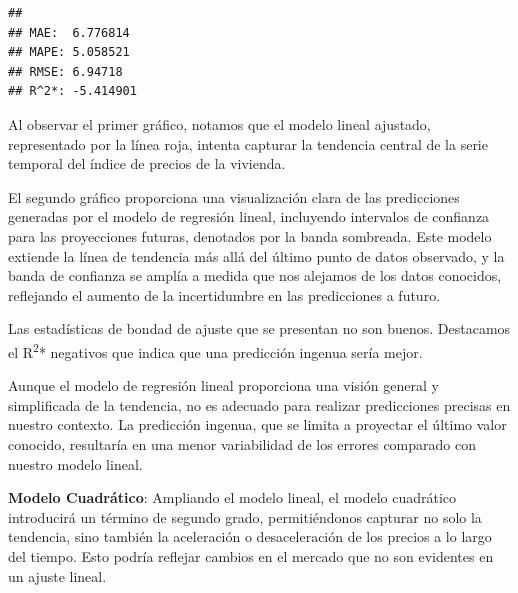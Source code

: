 \documentclass[
]{article}
\newenvironment{Shaded}{\begin{snugshade}}{\end{snugshade}}
\newcommand{\FunctionTok}[1]{\textcolor[rgb]{0.00,0.00,0.00}{#1}}
\newcommand{\NormalTok}[1]{#1}
\newcommand{\OtherTok}[1]{\textcolor[rgb]{0.56,0.35,0.01}{#1}}
\newcommand{\SpecialCharTok}[1]{\textcolor[rgb]{0.00,0.00,0.00}{#1}}
\begin{document}
\begin{Shaded}
\end{Shaded}

\begin{verbatim}
## 
## MAE:  6.776814 
## MAPE: 5.058521 
## RMSE: 6.94718 
## R^2*: -5.414901
\end{verbatim}

Al observar el primer gráfico, notamos que el modelo lineal ajustado,
representado por la línea roja, intenta capturar la tendencia central de
la serie temporal del índice de precios de la vivienda.

El segundo gráfico proporciona una visualización clara de las
predicciones generadas por el modelo de regresión lineal, incluyendo
intervalos de confianza para las proyecciones futuras, denotados por la
banda sombreada. Este modelo extiende la línea de tendencia más allá del
último punto de datos observado, y la banda de confianza se amplía a
medida que nos alejamos de los datos conocidos, reflejando el aumento de
la incertidumbre en las predicciones a futuro.

Las estadísticas de bondad de ajuste que se presentan no son buenos.
Destacamos el R\textsuperscript{2}* negativos que indica que una
predicción ingenua sería mejor.

Aunque el modelo de regresión lineal proporciona una visión general y
simplificada de la tendencia, no es adecuado para realizar predicciones
precisas en nuestro contexto. La predicción ingenua, que se limita a
proyectar el último valor conocido, resultaría en una menor variabilidad
de los errores comparado con nuestro modelo lineal.

\textbf{Modelo Cuadrático}: Ampliando el modelo lineal, el modelo
cuadrático introducirá un término de segundo grado, permitiéndonos
capturar no solo la tendencia, sino también la aceleración o
desaceleración de los precios a lo largo del tiempo. Esto podría
reflejar cambios en el mercado que no son evidentes en un ajuste lineal.
\end{document}
